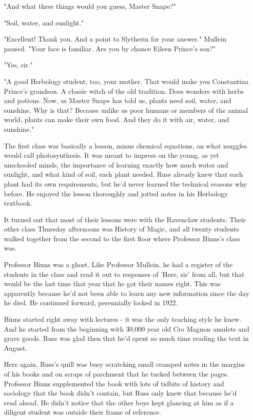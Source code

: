 \documentclass[a4paper,11pt]{article}
\begin{document}
"And what three things would you guess, Master Snape?"

"Soil, water, and sunlight."

"Excellent! Thank you. And a point to Slytherin for your answer." Mullein paused. "Your face is familiar. Are you by chance Eileen Prince's son?"

"Yes, sir."

"A good Herbology student, too, your mother. That would make you Constantina Prince's grandson. A classic witch of the old tradition. Does wonders with herbs and potions. Now, as Master Snape has told us, plants need soil, water, and sunshine. Why is that? Because unlike us poor humans or members of the animal world, plants can make their own food. And they do it with air, water, and sunshine."

The first class was basically a lesson, minus chemical equations, on what muggles would call photosynthesis. It was meant to impress on the young, as yet unschooled minds, the importance of learning exactly how much water and sunlight, and what kind of soil, each plant needed. Russ already knew that each plant had its own requirements, but he'd never learned the technical reasons why before. He enjoyed the lesson thoroughly and jotted notes in his Herbology textbook.

It turned out that most of their lessons were with the Ravenclaw students. Their other class Thursday afternoons was History of Magic, and all twenty students walked together from the second to the first floor where Professor Binns's class was.

Professor Binns was a ghost. Like Professor Mullein, he had a register of the students in the class and read it out to responses of 'Here, sir' from all, but that would be the last time that year that he got their names right. This was apparently because he'd not been able to learn any new information since the day he died. He continued forward, perennially locked in 1922.

Binns started right away with lectures - it was the only teaching style he knew. And he started from the beginning with 30,000 year old Cro Magnon amulets and grave goods. Russ was glad then that he'd spent so much time reading the text in August.

Here again, Russ's quill was busy scratching small cramped notes in the margins of his books and on scraps of parchment that he tucked between the pages. Professor Binns supplemented the book with lots of tidbits of history and sociology that the book didn't contain, but Russ only knew that because he'd read ahead. He didn't notice that the other boys kept glancing at him as if a diligent student was outside their frame of reference.
\end{document}
